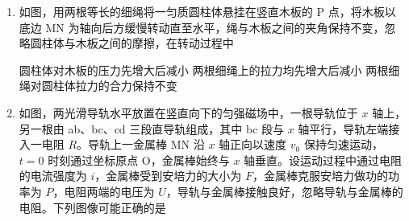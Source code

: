 \documentclass[\gkver]{gaokaozhenti}
\begin{document}
\begin{enumerate}
{可知 T 点电场方向指向 O 点，故 B 正确。

故选 B。
}

\item
如图，用两根等长的细绳将一匀质圆柱体悬挂在竖直木板的 P 点，将木板以底边 MN 为轴向后方缓慢转动直至水平，绳与木板之间的夹角保持不变，忽略圆柱体与木板之间的摩擦，在转动过程中


{圆柱体对木板的压力先增大后减小}
{两根细绳上的拉力均先增大后减小}
{两根细绳对圆柱体拉力的合力保持不变}


\item
如图，两光滑导轨水平放置在竖直向下的匀强磁场中，一根导轨位于 $x$ 轴上，另一根由 ab、bc、cd 三段直导轨组成，其中 bc 段与 $x$ 轴平行，导轨左端接入一电阻 $R$。导轨上一金属棒 MN 沿 $x$ 轴正向以速度 $v_{0}$ 保持匀速运动，$t=0$ 时刻通过坐标原点 O，金属棒始终与 $x$ 轴垂直。设运动过程中通过电阻的电流强度为 $i$，金属棒受到安培力的大小为 $F$，金属棒克服安培力做功的功率为 $P$，电阻两端的电压为 $U$，导轨与金属棒接触良好，忽略导轨与金属棒的电阻。下列图像可能正确的是


\end{enumerate}
\end{document}
